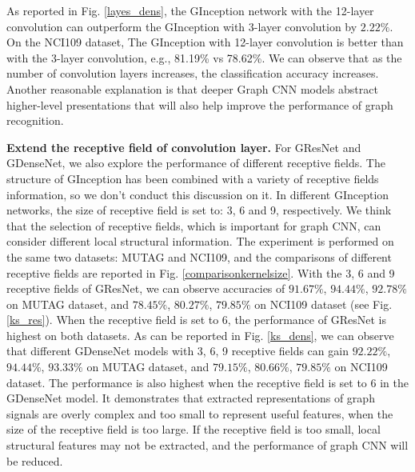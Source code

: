 \documentclass[journal]{IEEEtran}
\begin{document}
As reported in Fig. \ref{layes_dens}, the G\underline{\hspace{0.5em}}Inception network with the 12-layer convolution can outperform the G\underline{\hspace{0.5em}}Inception with 3-layer convolution by $2.22\%$.
On the NCI109 dataset, The G\underline{\hspace{0.5em}}Inception with 12-layer convolution is better than with the 3-layer convolution, e.g., 81.19\% vs 78.62\%.
We can observe that as the number of convolution layers increases, the classification accuracy increases. Another reasonable explanation is that deeper Graph CNN models abstract higher-level presentations that will also help improve the performance of graph recognition.

\textbf{Extend the receptive field of convolution layer.} For G\underline{\hspace{0.5em}}ResNet and G\underline{\hspace{0.5em}}DenseNet, we also explore the performance of different receptive fields.
The structure of G\underline{\hspace{0.5em}}Inception has been combined with a variety of receptive fields information, so we don't conduct this discussion on it.
In different G\underline{\hspace{0.5em}}Inception networks, the size of receptive field is set to: 3, 6  and 9, respectively.
We think that the selection of receptive fields, which is important for graph CNN, can consider different local structural information.
The experiment is performed on the same two datasets: MUTAG and NCI109, and the comparisons of different receptive fields are reported in Fig. \ref{comparisonkernelsize}.
With the 3, 6 and 9 receptive fields of G\underline{\hspace{0.5em}}ResNet, we can observe accuracies of $91.67\%$, $94.44\%$, $92.78\%$ on MUTAG dataset, and $78.45\%$, $80.27\%$, $79.85\%$ on NCI109 dataset (see Fig. \ref{ks_res}).
When the receptive field is set to 6, the performance of G\underline{\hspace{0.5em}}ResNet is  highest on both datasets.
As can be reported in Fig. \ref{ks_dens}, we can observe that different G\underline{\hspace{0.5em}}DenseNet models with 3, 6, 9 receptive fields can gain
$92.22\%$, $94.44\%$, $93.33\%$ on MUTAG dataset, and $79.15\%$, $80.66\%$, $79.85\%$ on NCI109 dataset.
The performance is also highest when the receptive field is set to 6 in the G\underline{\hspace{0.5em}}DenseNet model.
It demonstrates that extracted representations of graph signals are overly complex and too small to represent useful features, when the size of the receptive field is too large.
If the receptive field is too small, local structural features may not be extracted, and the performance of graph CNN will be reduced.
\end{document}
